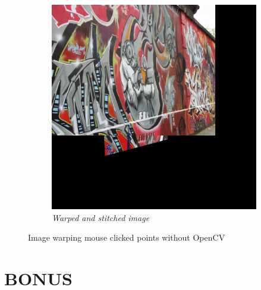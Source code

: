 \documentclass[11pt, a4paper]{article}
\begin{document}
\begin{figure}[H]
\begin{subfigure}[b]{0.32\textwidth}
		\centering
		\includegraphics[width=\textwidth]{./images/Q4im1Warp.jpg}
		\caption{{\small \textit{Warped and stitched image}}}
		\label{fig:3imw}
	\end{subfigure}
	\caption{Image warping mouse clicked points without OpenCV}
\end{figure}

\section{BONUS}
\end{document}

